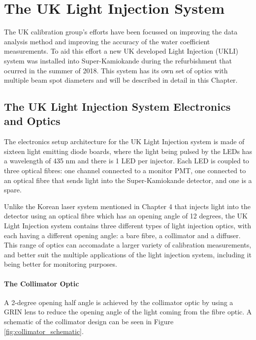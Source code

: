 \chapter{The UK Light Injection System}
\label{chp:ukli}

The UK calibration group's efforts have been focussed on improving the data analysis method and improving the accuracy of the water coefficient measurements. To aid this effort a new UK developed Light Injection (UKLI) system was installed into Super-Kamiokande during the refurbishment that ocurred in the summer of 2018. This system has its own set of optics with multiple beam spot diameters and will be described in detail in this Chapter. 

\section{The UK Light Injection System Electronics and Optics}

The electronics setup architecture for the UK Light Injection system is made of sixteen light emitting diode boards, where the light being pulsed by the LEDs has a wavelength of 435 nm and there is 1 LED per injector. Each LED is coupled to three optical fibres: one channel connected to a monitor PMT, one connected to an optical fibre that sends light into the Super-Kamiokande detector, and one is a spare.
\newline

Unlike the Korean laser system mentioned in Chapter 4 that injects light into the detector using an optical fibre which has an opening angle of 12 degrees, the UK Light Injection system contains three different types of light injection optics, with each having a different opening angle: a bare fibre, a collimator and a diffuser. This range of optics can accomadate a larger variety of calibration measurements, and better suit the multiple applications of the light injection system, including it being better for monitoring purposes. 

\subsubsection{The Collimator Optic}

A 2-degree opening half angle is achieved by the collimator optic by using a GRIN lens to reduce the opening angle of the light coming from the fibre optic. A schematic of the collimator design can be seen in Figure \ref{fig:collimator_schematic}. 

